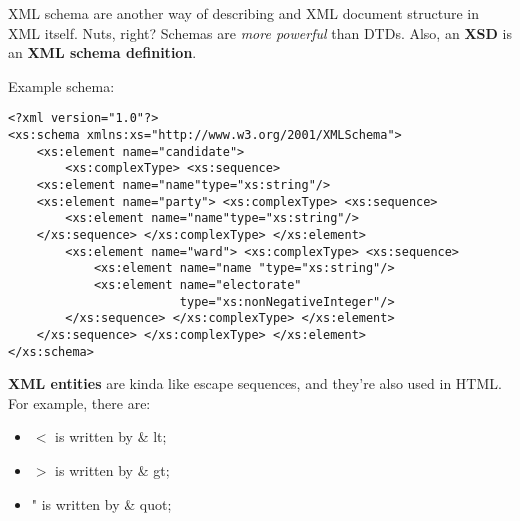 \documentclass[11pt,a4paper,titlepage,dvipsnames,cmyk]{scrartcl}
\begin{document}
XML schema are another way of describing and XML document structure in XML
itself. Nuts, right? Schemas are \textit{more powerful} than DTDs. Also,
an \textbf{XSD} is an \textbf{XML schema definition}.

Example schema:
\begin{lstlisting}[style=B]
<?xml version="1.0"?>
<xs:schema xmlns:xs="http://www.w3.org/2001/XMLSchema">
    <xs:element name="candidate">
        <xs:complexType> <xs:sequence>
    <xs:element name="name"type="xs:string"/>
    <xs:element name="party"> <xs:complexType> <xs:sequence>
        <xs:element name="name"type="xs:string"/>
    </xs:sequence> </xs:complexType> </xs:element>
        <xs:element name="ward"> <xs:complexType> <xs:sequence>
            <xs:element name="name "type="xs:string"/>
            <xs:element name="electorate"
                        type="xs:nonNegativeInteger"/>
        </xs:sequence> </xs:complexType> </xs:element>
    </xs:sequence> </xs:complexType> </xs:element>
</xs:schema>
\end{lstlisting}

\textbf{XML entities} are kinda like escape sequences, and they're also
used in HTML. For example, there are:
\begin{itemize}
    \item $<$ is written by \& lt;
    \item $>$ is written by \& gt;
    \item " is written by \& quot;
\end{itemize}
\end{document}
